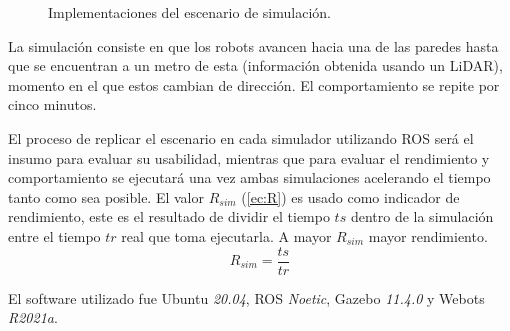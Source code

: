 \begin{figure}[H]
  \centering
  \qquad
  \caption{Implementaciones del escenario de simulación.}\label{fig:impsim}
\end{figure}

La simulación consiste en que los robots avancen hacia una de las paredes
hasta que se encuentran a un metro de esta (información obtenida usando un \gls{LiDAR}), momento en el que 
estos cambian de dirección. El comportamiento se repite por cinco minutos.

El proceso de replicar el escenario en cada simulador utilizando \gls{ROS} será el
insumo para evaluar su usabilidad, mientras que para evaluar el rendimiento y
comportamiento se ejecutará una vez ambas simulaciones acelerando el tiempo
tanto como sea posible. El valor $R_{sim}$ (\ref{ec:R}) es usado como indicador de
rendimiento, este es el resultado de dividir el tiempo $ts$ dentro de la simulación entre el
tiempo $tr$ real que toma ejecutarla. A mayor $R_{sim}$ mayor rendimiento.
\begin{equation}\label{ec:R} R_{sim} = \frac{ts}{tr} \end{equation}

El software utilizado fue Ubuntu \emph{20.04}, \gls{ROS} \emph{Noetic}, Gazebo \emph{11.4.0} y Webots \emph{R2021a}. 

